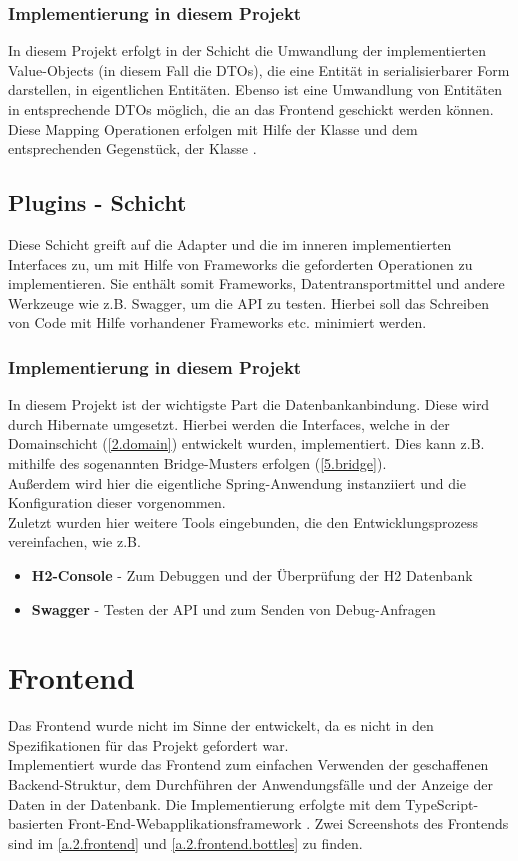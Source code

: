 			\subsubsection{Implementierung in diesem Projekt}
			In diesem Projekt erfolgt in der Schicht die Umwandlung der implementierten Value-Objects (in diesem Fall die DTOs), die eine Entität in serialisierbarer Form darstellen, in eigentlichen Entitäten. Ebenso ist eine Umwandlung von Entitäten in entsprechende DTOs möglich, die an das Frontend geschickt werden können. \\
			Diese Mapping Operationen erfolgen mit Hilfe der Klasse  und dem entsprechenden Gegenstück, der Klasse .
		
		\subsection{Plugins - Schicht}	
		Diese Schicht greift auf die Adapter und die im inneren implementierten Interfaces zu, um mit Hilfe von Frameworks die geforderten Operationen zu implementieren. Sie enthält somit Frameworks, Datentransportmittel und andere Werkzeuge wie z.B. Swagger, um die API zu testen. Hierbei soll das Schreiben von Code mit Hilfe vorhandener Frameworks etc. minimiert werden.
			\subsubsection{Implementierung in diesem Projekt}
			In diesem Projekt ist der wichtigste Part die Datenbankanbindung. Diese wird durch Hibernate umgesetzt. Hierbei werden die Interfaces, welche in der Domainschicht (\cref{2.domain}) entwickelt wurden, implementiert. Dies kann z.B. mithilfe des sogenannten Bridge-Musters erfolgen (\cref{5.bridge}). \\
			Außerdem wird hier die eigentliche Spring-Anwendung instanziiert und die Konfiguration dieser vorgenommen. \\
			Zuletzt wurden hier weitere Tools eingebunden, die den Entwicklungsprozess vereinfachen, wie z.B.
			\begin{itemize}
				\item \textbf{H2-Console} - Zum Debuggen und der Überprüfung der H2 Datenbank
				\item \textbf{Swagger} - Testen der API und zum Senden von Debug-Anfragen
			\end{itemize}
		
	\section{Frontend}
	Das Frontend wurde nicht im Sinne der  entwickelt, da es nicht in den Spezifikationen für das Projekt gefordert war. \\
	Implementiert wurde das Frontend zum einfachen Verwenden der geschaffenen Backend-Struktur, dem Durchführen der Anwendungsfälle und der Anzeige der Daten in der Datenbank. Die Implementierung erfolgte mit dem TypeScript-basierten Front-End-Webapplikationsframework  \cite{angular.angular}. Zwei Screenshots des Frontends sind im \cref{a.2.frontend} und \cref{a.2.frontend.bottles} zu finden.
			
	
	